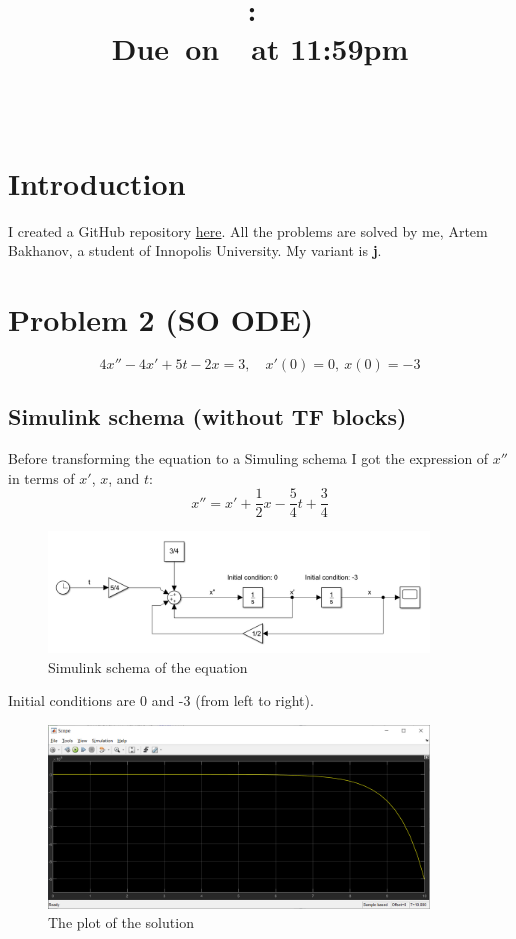 \documentclass{article}
\title{
    \vspace{2in}
    \textmd{\textbf{\hmwkClass:\ \hmwkTitle}}\\
    \normalsize\vspace{0.1in}\small{Due\ on\ \hmwkDueDate\ at 11:59pm}\\
    \vspace{0.1in}\large{\textit{\hmwkClassInstructor\ }}
    \vspace{3in}
}
\author{\hmwkAuthorName}
\date{}
\begin{document}
\maketitle

\pagebreak
\section{Introduction}
    I created a GitHub repository \href{https://github.com/artembakhanov/ControlTheoryHomework}{here}.
    All the problems are solved by me, Artem Bakhanov, a student of Innopolis University. My variant is \textbf{j}.
    
\section{Problem 2 (SO ODE)}
    \begin{equation}
        4x'' - 4x' + 5t - 2x = 3, \quad x'(0) = 0, \ x(0) = -3
    \end{equation}
    \subsection{Simulink schema (without TF blocks)}
    Before transforming the equation to a Simuling schema I got the expression of $x''$ in terms of $x'$, $x$, and $t$:
    \begin{equation}
        x'' = x' + \frac{1}{2} x  - \frac{5}{4} t + \frac{3}{4} 
    \end{equation}
    \begin{figure}[ht]
        \centering
        \includegraphics[width=0.9\textwidth]{images/schema2A_j.png}
        \caption{Simulink schema of the equation}
        \label{fig:simulink2}
    \end{figure}
    Initial conditions are 0 and -3 (from left to right).
    \begin{figure}[ht]
        \centering
        \includegraphics[width=0.9\textwidth]{images/plot2A_j.png}
        \caption{The plot of the solution}
        \label{fig:plot2a}
    \end{figure}
    
\end{document}
